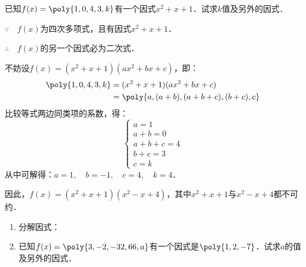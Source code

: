 \begin{example}
    已知$f(x)=\poly{1,0,4,3,k}$有一个因式$x^2+x+1$．试求$k$值及另外的因式．
\end{example}

\begin{solution}
    $\because\quad f(x)$为四次多项式，且有因式$x^2+x+1$．

    $\therefore\quad f(x)$的另一个因式必为二次式．

    不妨设$f(x)=(x^2+x+1)(ax^2+bx+c)$，即：
\[\begin{split}
    \poly{1,0,4,3,k}&=(x^2+x+1)(ax^2+bx+c)\\
    &=\poly{a,(a+b),(a+b+c),(b+c),c}
\end{split}\]
比较等式两边同类项的系数，得：
\[\begin{cases}
    a=1\\
    a+b=0\\
    a+b+c=4\\
    b+c=3\\
    c=k
\end{cases}\]
从中可解得：$a=1,\quad b=-1,\quad c=4,\quad k=4$．

因此，$f(x)=(x^2+x+1)(x^2-x+4)$，其中$x^2+x+1$与$x^2-x+4$都不可约．
\end{solution}

\begin{ex}
\begin{enumerate}
    \item 分解因式：
\begin{enumerate}
\end{enumerate}
\item  已知$f(x)=\poly{3,-2,-32,66,a}$有一个因式是$\poly{1,2,-7}$．试求$a$的值及另外的因式．
\end{enumerate}    
\end{ex}

